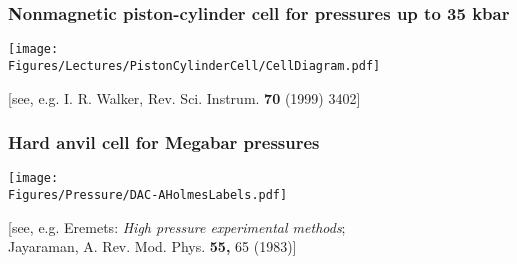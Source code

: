 \begin{frame}[label=Piston-cylinder]
\frametitle{Nonmagnetic piston-cylinder cell for pressures up to 35 kbar}

\texttt{[image: \\Figures/Lectures/PistonCylinderCell/CellDiagram.pdf]}

\centerline {\small [see, e.g. I. R. Walker, Rev. Sci. Instrum. {\bf 70} (1999) 3402]}
\end{frame}

\begin{frame}[label=Diamond anvil]
\frametitle{Hard anvil cell for Megabar pressures}

\texttt{[image: \\Figures/Pressure/DAC-AHolmesLabels.pdf]}


\begin{center} 
{\small [see, e.g. Eremets: {\em High pressure
    experimental methods}; \\ Jayaraman, A. Rev. Mod. Phys. {\bf
    55,} 65 (1983)] }
\end{center}
\end{frame}

